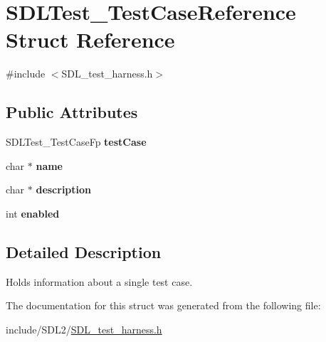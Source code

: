 \hypertarget{struct_s_d_l_test___test_case_reference}{}\section{S\+D\+L\+Test\+\_\+\+Test\+Case\+Reference Struct Reference}
\label{struct_s_d_l_test___test_case_reference}


{\ttfamily \#include $<$S\+D\+L\+\_\+test\+\_\+harness.\+h$>$}

\subsection*{Public Attributes}
\begin{DoxyCompactItemize}
\item 
\mbox{\label{struct_s_d_l_test___test_case_reference_af9472f0c421a2845b540fc28fb30a3ef}} 
S\+D\+L\+Test\+\_\+\+Test\+Case\+Fp {\bfseries test\+Case}
\item 
\mbox{\label{struct_s_d_l_test___test_case_reference_aabd588c915c52fb13bcd0c71e071a604}} 
char $\ast$ {\bfseries name}
\item 
\mbox{\label{struct_s_d_l_test___test_case_reference_a1ee6c8a2529fdfcd62bb1483c26be67d}} 
char $\ast$ {\bfseries description}
\item 
\mbox{\label{struct_s_d_l_test___test_case_reference_a15168c85e38cae7557b4beb477ef6f9a}} 
int {\bfseries enabled}
\end{DoxyCompactItemize}


\subsection{Detailed Description}
Holds information about a single test case. 

The documentation for this struct was generated from the following file\+:\begin{DoxyCompactItemize}
\item 
include/\+S\+D\+L2/\hyperlink{_s_d_l__test__harness_8h}{S\+D\+L\+\_\+test\+\_\+harness.\+h}\end{DoxyCompactItemize}
